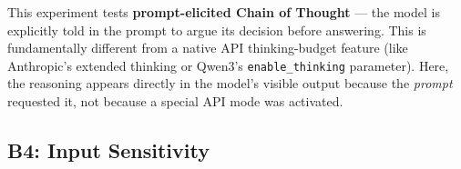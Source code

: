 \documentclass[11pt,a4paper]{article}
\begin{document}
\begin{notebox}
This experiment tests \textbf{prompt-elicited Chain of Thought} --- the model
is explicitly told in the prompt to argue its decision before answering.
This is fundamentally different from a native API thinking-budget feature
(like Anthropic's extended thinking or Qwen3's \texttt{enable\_thinking}
parameter). Here, the reasoning appears directly in the model's visible
output because the \emph{prompt} requested it, not because a special API
mode was activated.
\end{notebox}


\subsection{B4: Input Sensitivity}\label{sec:b4}
\end{document}
